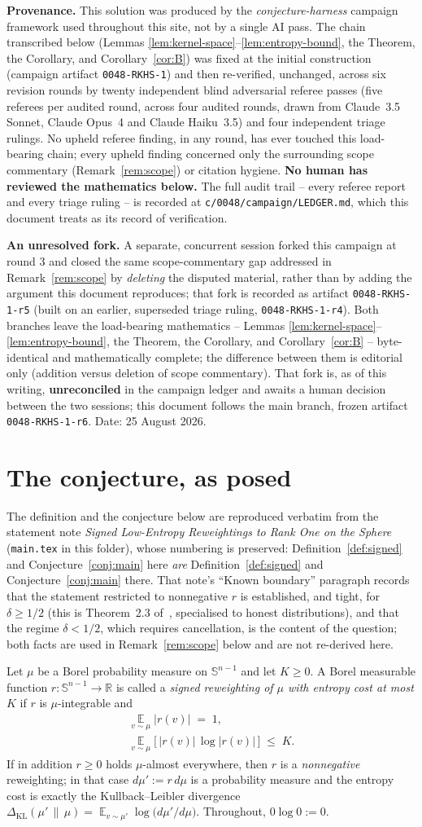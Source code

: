 \documentclass{aicr-solution}
\newcommand{\Expect}{\operatorname*{\mathbb{E}}}
\newcommand{\Sph}{\mathbb{S}^{n-1}}
\newcommand{\Reals}{\mathbb{R}}
\newcommand{\KL}{\Delta_{\mathrm{KL}}}
\newcommand{\PaperDate}{25 August 2026}
\newcommand{\AIDisclosure}{%
  \begingroup\small
  \noindent\textbf{Provenance.} This solution was produced by the
  \emph{conjecture-harness} campaign framework used throughout this
  site, not by a single AI pass. The chain transcribed below (Lemmas
  \ref{lem:kernel-space}--\ref{lem:entropy-bound}, the Theorem, the
  Corollary, and Corollary~\ref{cor:B}) was fixed at the initial
  construction (campaign artifact \texttt{0048-RKHS-1}) and then
  re-verified, unchanged, across six revision rounds by twenty
  independent blind adversarial referee passes (five referees per
  audited round, across four audited rounds, drawn from Claude~3.5
  Sonnet, Claude Opus~4 and Claude Haiku~3.5) and four independent
  triage rulings. No upheld referee finding, in any round, has ever
  touched this load-bearing chain; every upheld finding concerned only
  the surrounding scope commentary (Remark~\ref{rem:scope}) or
  citation hygiene. \textbf{No human has reviewed the mathematics
  below.} The full audit trail -- every referee report and every
  triage ruling -- is recorded at
  \texttt{c/0048/campaign/LEDGER.md}, which this document treats as
  its record of verification.

  \smallskip
  \noindent\textbf{An unresolved fork.} A separate, concurrent
  session forked this campaign at round 3 and closed the same
  scope-commentary gap addressed in Remark~\ref{rem:scope} by
  \emph{deleting} the disputed material, rather than by adding the
  argument this document reproduces; that fork is recorded as
  artifact \texttt{0048-RKHS-1-r5} (built on an earlier, superseded
  triage ruling, \texttt{0048-RKHS-1-r4}). Both branches leave the
  load-bearing mathematics -- Lemmas
  \ref{lem:kernel-space}--\ref{lem:entropy-bound}, the Theorem, the
  Corollary, and Corollary~\ref{cor:B} -- byte-identical and
  mathematically complete; the difference between them is editorial
  only (addition versus deletion of scope commentary). That fork is,
  as of this writing, \textbf{unreconciled} in the campaign ledger and
  awaits a human decision between the two sessions; this document
  follows the main branch, frozen artifact \texttt{0048-RKHS-1-r6}.
  Date: \PaperDate.
  \endgroup
}
\begin{document}

\vspace{0.6em}
\AIDisclosure

\vspace{1em}

\section*{The conjecture, as posed}\label{sec:posed}

The definition and the conjecture below are reproduced verbatim from
the statement note \emph{Signed Low-Entropy Reweightings to Rank One
on the Sphere} (\texttt{main.tex} in this folder), whose numbering is
preserved: Definition~\ref{def:signed} and
Conjecture~\ref{conj:main} here \emph{are} Definition~\ref{def:signed}
and Conjecture~\ref{conj:main} there. That note's ``Known boundary''
paragraph records that the statement restricted to nonnegative $r$ is
established, and tight, for $\delta \ge 1/2$ (this is
Theorem~2.3 of~\cite{BKS16}, specialised to honest distributions), and
that the regime $\delta < 1/2$, which requires cancellation, is the
content of the question; both facts are used in
Remark~\ref{rem:scope} below and are not re-derived here.

\begin{definition}\label{def:signed}
Let $\mu$ be a Borel probability measure on $\Sph$ and let $K \ge 0$.
A Borel measurable function $r : \Sph \to \Reals$ is called a
\emph{signed reweighting of $\mu$ with entropy cost at most $K$} if
$r$ is $\mu$-integrable and
\[
\begin{gathered}
  \Expect_{v \sim \mu} \big| r(v) \big| \;=\; 1, \\[0.25em]
  \Expect_{v \sim \mu} \Big[\, \big| r(v) \big| \,
    \log \big| r(v) \big| \,\Big] \;\le\; K .
\end{gathered}
\]
If in addition $r \ge 0$ holds $\mu$-almost everywhere, then $r$ is a
\emph{nonnegative} reweighting; in that case $d\mu' := r \, d\mu$ is a
probability measure and the entropy cost is exactly the
Kullback--Leibler divergence $\KL(\mu' \,\|\, \mu) = \Expect_{v \sim
\mu'} \log\big( d\mu'/d\mu \big)$. Throughout, $0 \log 0 := 0$.
\end{definition}
\end{document}
